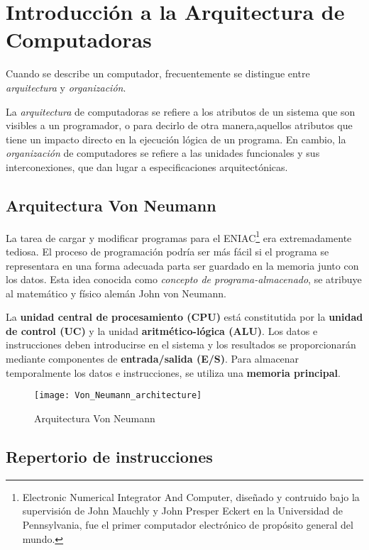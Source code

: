 \section{Introducción a la Arquitectura de Computadoras}

Cuando se describe un computador, frecuentemente se distingue entre \textit{arquitectura} y \textit{organización}.

La \textit{arquitectura} de computadoras se refiere a los atributos de un sistema que son visibles a un programador, o para decirlo de otra manera,aquellos atributos que tiene un impacto directo en la ejecución lógica de un programa.
En cambio, la \textit{organización} de computadores se refiere a las unidades funcionales y sus interconexiones, que dan lugar a especificaciones arquitectónicas.

\subsection{Arquitectura Von Neumann}

La tarea de cargar y modificar programas para el ENIAC\footnote{Electronic Numerical Integrator And Computer, diseñado y contruido bajo la supervisión de John Mauchly y John Presper Eckert en la Universidad de Pennsylvania, fue el primer computador electrónico de propósito general del mundo.} era extremadamente tediosa. El proceso de programación podría ser más fácil si el programa se representara en una forma adecuada parta ser guardado en la memoria junto con los datos.
Esta idea conocida como \textit{concepto de programa-almacenado}, se atribuye al matemático y físico alemán John von Neumann.

La \textbf{unidad central de procesamiento (CPU)} está constitutida por la \textbf{unidad de control (UC)} y la unidad \textbf{aritmético-lógica (ALU)}.
Los datos e instrucciones deben introducirse en el sistema y los resultados se proporcionarán mediante componentes de \textbf{entrada/salida (E/S)}.
Para almacenar temporalmente los datos e instrucciones, se utiliza una \textbf{memoria principal}.

\begin{figure}[h]
  \centering
  \texttt{[image: Von\_Neumann\_architecture]}
  \caption{Arquitectura Von Neumann}
\end{figure}
\subsection{Repertorio de instrucciones}

